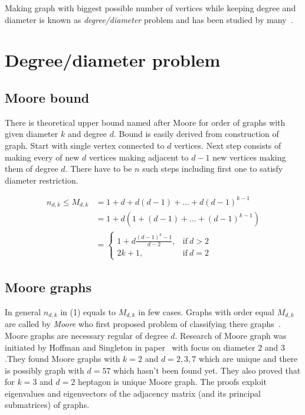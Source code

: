 \documentclass[a4paper,11pt,twoside]{report}%
\begin{document}
Making graph with biggest possible number of vertices while keeping degree and diameter is known as \textit{degree/diameter} problem and has been studied by many~\cite{Degree-diameter-survey}.

\newpage

\section{Degree/diameter problem}
\subsection{Moore bound}

There is theoretical upper bound named after Moore for order of graphs with given diameter $k$ and degree $d$. Bound is easily derived from construction of graph. Start with single vertex connected to $d$ vertices. Next step consists of making every of new $d$ vertices making adjacent to $d-1$ new vertices making them of degree $d$. There have to be $n$ such steps including first one to satisfy diameter restriction. 

\begin{equation}
	\begin{split}
		n_{d,k} \leq M_{d,k}	& = 1 + d + d(d - 1) + \dots + d(d - 1)^{k-1}  \\
				 				& = 1 + d(1 + (d - 1) + \dots + (d - 1)^{k-1}) \\
				 				& =	\begin{cases}
										1+d\frac{(d-1)^{k}-1}{d-2}, & \text{if}\ d > 2 \\
										2k+1, & \text{if}\ d=2 
									\end{cases}
	\end{split}
\end{equation}

\subsection{Moore graphs}
In general $n_{d,k}$ in (1) equals to $M_{d,k}$ in few cases. Graphs with order equal $M_{d,k}$ are called by \textit{Moore} who first proposed problem of classifying there graphs~\cite{ Hoffman-Singleton }. Moore graphs are  necessary regular of degree $d$. Research of Moore graph was initiated by Hoffman and Singleton in paper~\cite{Hoffman-Singleton} with focus on diameter $2$ and $3$.They found Moore graphs with $k=2$ and $d=2,3,7$ which are unique and there is possibly graph with $d=57$ which hasn't been found yet. They also proved that for $k=3$ and $d=2$ heptagon is unique Moore graph. The proofs exploit eigenvalues and eigenvectors of the adjacency matrix (and its principal submatrices) of graphs. \\
\end{document}
